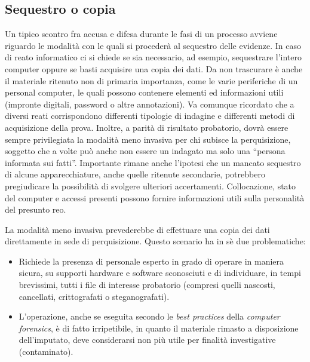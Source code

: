 \subsection{Sequestro o copia}

Un tipico scontro fra accusa e difesa durante le fasi di un processo avviene riguardo le modalità con le quali si procederà al sequestro delle evidenze. \cite{Vierika} In caso di reato informatico ci si chiede se sia necessario, ad esempio, sequestrare l'intero computer oppure se basti acquisire una copia dei dati. Da non trascurare è anche il materiale ritenuto non di primaria importanza, come le varie periferiche di un personal computer, le quali possono contenere elementi ed informazioni utili (impronte digitali, password o altre annotazioni). Va comunque ricordato che a diversi reati corrispondono differenti tipologie di indagine e differenti metodi di acquisizione della prova. Inoltre, a parità di risultato probatorio, dovrà essere sempre privilegiata la modalità meno invasiva per chi subisce la perquisizione, soggetto che a volte può anche non essere un indagato ma solo una ``persona informata sui fatti''. Importante rimane anche l'ipotesi che un mancato sequestro di alcune apparecchiature, anche quelle ritenute secondarie,  potrebbero pregiudicare la possibilità di svolgere ulteriori accertamenti. Collocazione, stato del computer e accessi presenti possono fornire informazioni utili sulla personalità del presunto reo.

La modalità meno invasiva prevederebbe di effettuare una copia dei dati direttamente in sede di perquisizione. Questo scenario ha in sè due problematiche:

\begin{itemize} 

	\item{Richiede la presenza di personale esperto in grado di operare in maniera sicura, su supporti hardware e software sconosciuti e di individuare, in tempi brevissimi, tutti i file di interesse probatorio (compresi quelli nascosti, cancellati, crittografati o steganografati).}

	\item{L'operazione, anche se eseguita secondo le \textit{best practices} della \textit{computer forensics}, è di fatto irripetibile, in quanto il materiale rimasto a disposizione dell'imputato, deve considerarsi non più utile per finalità investigative (contaminato).}

\end{itemize}

